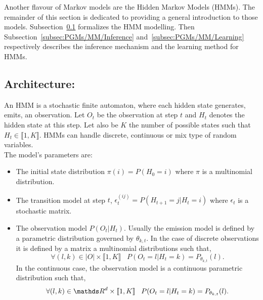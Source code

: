 \documentclass[a4paper,11pt]{report}
\begin{document}
    Another flavour of Markov models are the Hidden Markov Models (HMMs). The remainder of this section is dedicated to providing a general introduction to those models. Subsection~\ref{subsec:PGMs/MM/Architecture} formalizes the HMM modelling. Then Subsection~\ref{subsec:PGMs/MM/Inference} and~\ref{subsec:PGMs/MM/Learning} respectively describes the inference mechanism and the learning method for HMMs.    
    
    \subsection{Architecture:}
      \label{subsec:PGMs/MM/Architecture}
      
      An HMM is a stochastic finite automaton, where each hidden state generates, \ie emits, an observation. Let $O_{t}$ be the observation at step $t$ and $H_{t}$ denotes the hidden state at this step. Let also be $K$ the number of possible states such that $H_{t} \in \llbracket 1, K \rrbracket$. HMMs can handle discrete, continuous or mix type of random variables.\\
      
      The model's parameters are:\\ 
      
      \begin{itemize}
        \item The initial state distribution $\pi(i) = P(H_{0} = i)$ where $\pi$ is a multinomial distribution.\\
        \item The transition model at step $t$, $\epsilon_{t}^{(ij)} = P(H_{t+1} = j | H_{t} = i)$ where $\epsilon_{t}$ is a stochastic matrix.\\
        \item The observation model $P(O_{t}|H_{t})$. Usually the emission model is defined by a parametric distribution governed by $\theta_{k,t}$. In the case of discrete observations it is defined by a matrix a multinomial distributions such that,
					\begin{equation*}
						\forall (l,k) \in |O| \times \llbracket 1, K \rrbracket \;\;\;
						P(O_{t}= l| H_{t}=k) = P_{\theta_{k,t}}(l).
					\end{equation*}
					In the continuous case, the observation model is a continuous parametric distribution such that,
					\begin{equation*}
						\forall (l,k) \in \dsR^{d} \times \llbracket 1, K \rrbracket \;\;\;
						P(O_{t}= l| H_{t}=k) = P_{\theta_{k,t}}(l).
					\end{equation*}\\
      \end{itemize}
\end{document}
